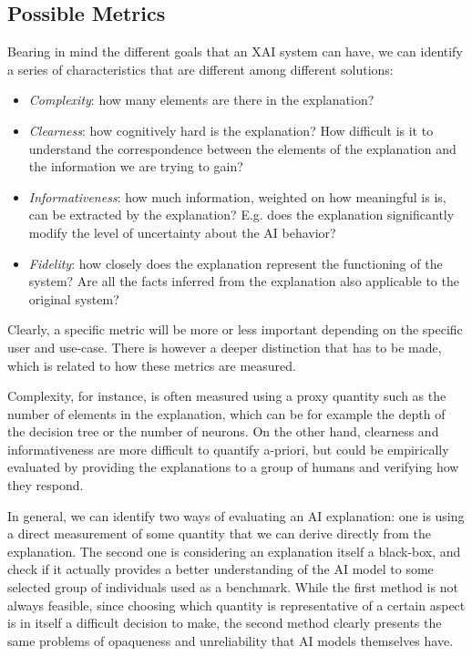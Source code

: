 \documentclass[conference]{IEEEtran}
\begin{document}
\subsection{Possible Metrics}
\label{sec:dimensions}

Bearing in mind the different goals that an XAI system can have, we can identify
a series of characteristics that are different among different solutions:

\begin{itemize}
    \item \textit{Complexity}: how many elements are there in the explanation?
    \item \textit{Clearness}: how cognitively hard is the explanation? How
          difficult is it to understand the correspondence between the elements
          of the explanation and the information we are trying to gain?
    \item \textit{Informativeness}: how much information, weighted on how
          meaningful is is, can be extracted by the explanation? E.g. does the
          explanation significantly modify the level of uncertainty about the AI
          behavior?
    \item \textit{Fidelity}: how closely does the explanation represent the
          functioning of the system? Are all the facts inferred from the
          explanation also applicable to the original system?
\end{itemize}

Clearly, a specific metric will be more or less important depending on the
specific user and use-case. There is however a deeper distinction that has to be
made, which is related to how these metrics are measured.

Complexity, for instance, is often measured using a proxy quantity such as
the number of elements in the explanation, which can be for example the depth of
the decision tree or the number of neurons. On the other hand, clearness and
informativeness are more difficult to quantify a-priori, but could be
empirically evaluated by providing the explanations to a group of humans and
verifying how they respond.

In general, we can identify two ways of evaluating an AI explanation: one is
using a direct measurement of some quantity that we can derive directly from the
explanation. The second one is considering an explanation itself a black-box,
and check if it actually provides a better understanding of the AI model to some
selected group of individuals used as a benchmark. While the first method is not
always feasible, since choosing which quantity is representative of a certain
aspect is in itself a difficult decision to make, the second method clearly
presents the same problems of opaqueness and unreliability that AI models
themselves have.
\end{document}
